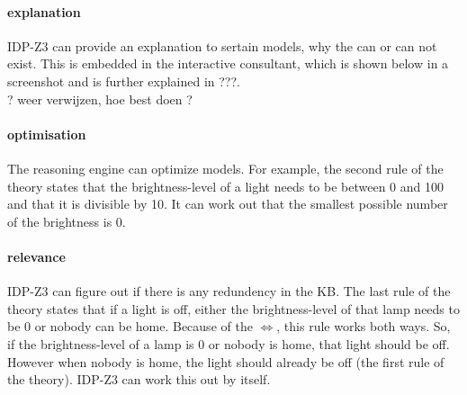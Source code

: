 \documentclass[11pt,a4paper]{report}
\begin{document}
\paragraph{explanation}
IDP-Z3 can provide an explanation to sertain models, why the can or can not exist. This is embedded in the interactive consultant, which is shown below in a screenshot and is further explained in ???.\\
? weer verwijzen, hoe best doen ?

\paragraph{optimisation}
The reasoning engine can optimize models. For example, the second rule of the theory states that the brightness-level of a light needs to be between 0 and 100 and that it is divisible by 10. It can work out that the smallest possible number of the brightness is 0.

\paragraph{relevance}
IDP-Z3 can figure out if there is any redundency in the KB. The last rule of the theory states that if a light is off, either the brightness-level of that lamp needs to be 0 or nobody can be home. Because of the $\Leftrightarrow$, this rule works both ways. So, if the brightness-level of a lamp is 0 or nobody is home, that light should be off. However when nobody is home, the light should already be off (the first rule of the theory). IDP-Z3 can work this out by itself.
\end{document}
